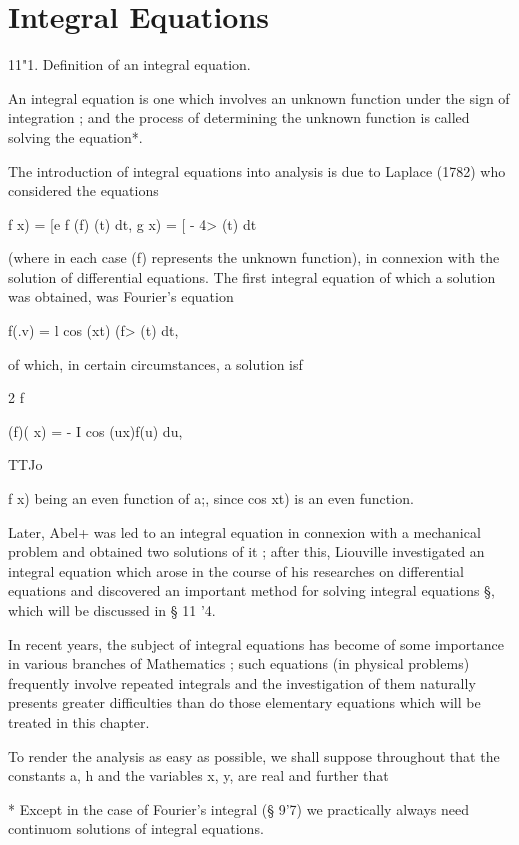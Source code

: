\chapter{Integral Equations} 

11"1. Definition of an integral equation. 

An integral equation is one which involves an unknown function under 
the sign of integration ; and the process of determining the unknown function 
is called solving the equation*. 

The introduction of integral equations into analysis is due to Laplace 
(1782) who considered the equations 

f x) = [e f (f) (t) dt, g  x) = [ -  4> (t) dt 

(where in each case (f) represents the unknown function), in connexion with 
the solution of differential equations. The first integral equation of which 
a solution was obtained, was Fourier's equation 

f(.v) = l cos (xt) (f> (t) dt, 

of which, in certain circumstances, a solution isf 

2 f  

(f)( x) = - I cos (ux)f(u) du, 

TTJo 

f x) being an even function of a;, since cos  xt) is an even function. 

Later, Abel+ was led to an integral equation in connexion with a mechanical 
problem and obtained two solutions of it ; after this, Liouville investigated an 
integral equation which arose in the course of his researches on differential 
equations and discovered an important method for solving integral equations §, 
which will be discussed in § 11 '4. 

In recent years, the subject of integral equations has become of some 
importance in various branches of Mathematics ; such equations (in physical 
problems) frequently involve repeated integrals and the investigation of them 
naturally presents greater difficulties than do those elementary equations 
which will be treated in this chapter. 

To render the analysis as easy as possible, we shall suppose throughout 
that the constants a, h and the variables x, y,   are real and further that 

* Except in the case of Fourier's integral (§ 9'7) we practically always need continuom 
solutions of integral equations. 

